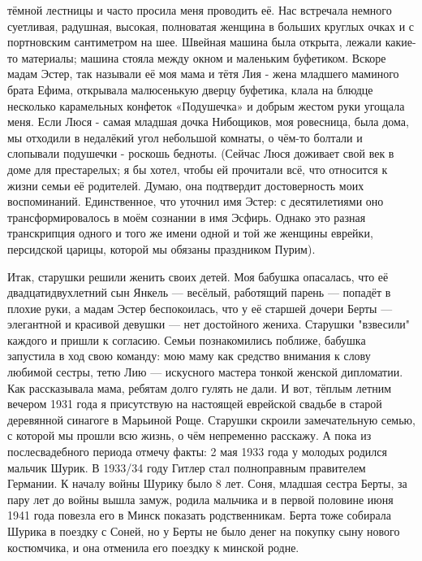 \label{057-1}
тёмной лестницы и часто просила меня проводить её. Нас встречала немного суетливая, радушная, высокая, полноватая женщина в больших круглых очках и с портновским сантиметром на шее. Швейная машина была открыта, лежали какие-то материалы; машина стояла между окном и маленьким буфетиком. Вскоре мадам Эстер, так называли её моя мама и тётя Лия - жена младшего маминого брата Ефима, открывала малюсенькую дверцу буфетика, клала на блюдце несколько карамельных конфеток «Подушечка» и добрым жестом руки угощала меня. Если Люся - самая младшая дочка Нибощиков, моя ровесница, была дома, мы отходили в недалёкий угол небольшой комнаты, о чём-то болтали и слопывали подушечки - роскошь бедноты. (Сейчас Люся доживает свой век в доме для престарелых; я бы хотел, чтобы ей прочитали всё, что относится к жизни семьи её родителей. Думаю, она подтвердит достоверность моих воспоминаний. Единственное, что уточнил имя Эстер: с десятилетиями оно трансформировалось в моём сознании в имя Эсфирь. Однако это разная транскрипция одного и того же имени одной и той же женщины еврейки, персидской царицы, которой мы обязаны праздником Пурим).

\label{058-1}
Итак, старушки решили женить своих детей. Моя бабушка опасалась, что её двадцатидвухлетний сын Янкель — весёлый, работящий парень — попадёт в плохие руки, а мадам Эстер беспокоилась, что у её старшей дочери Берты — элегантной и красивой девушки — нет достойного жениха. Старушки "взвесили" каждого и пришли к согласию. Семьи познакомились поближе, бабушка запустила в ход свою команду: мою маму как средство внимания к слову любимой сестры, тетю Лию — искусного мастера тонкой женской дипломатии. Как рассказывала мама, ребятам долго гулять не дали. И вот, тёплым летним вечером 1931 года я присутствую на настоящей еврейской свадьбе в старой деревянной синагоге в Марьиной Роще. Старушки скроили замечательную семью, с которой мы прошли всю жизнь, о чём непременно расскажу. А пока из послесвадебного периода отмечу факты: 2 мая 1933 года у молодых родился мальчик Шурик. В 1933/34 году Гитлер стал полноправным правителем Германии. К началу войны Шурику было 8 лет. Соня, младшая сестра Берты, за пару лет до войны вышла замуж, родила мальчика и в первой половине июня 1941 года повезла его в Минск показать родственникам. Берта тоже собирала Шурика в поездку с Соней, но у Берты не было денег на покупку сыну нового костюмчика, и она отменила его поездку к минской родне.

